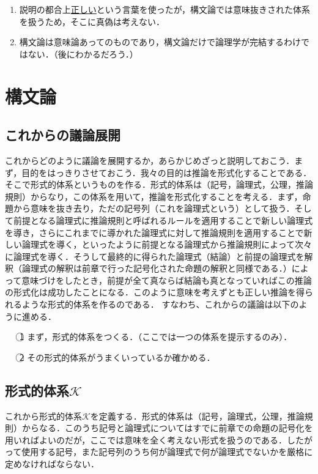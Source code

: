 \documentclass[10pt,b5paper,papersize,dvipdfmx]{jsbook}
\newcommand\maru[1]{\textcircled{\scriptsize{}#1}}
\newenvironment{TEIRI}[1]{
  \itemize
  \item [\headfont #1]
}{\enditemize}
\begin{document}
\begin{TEIRI}{※注意}
  \begin{enumerate}
    \item 説明の都合上\underline{正しい}という言葉を使ったが，構文論では意味抜きされた体系を扱うため，そこに真偽は考えない．
    \item 構文論は意味論あってのものであり，構文論だけで論理学が完結するわけではない．（後にわかるだろう．）
  \end{enumerate}
\end{TEIRI}

\section{構文論}
\subsection{これからの議論展開}
これからどのように議論を展開するか，あらかじめざっと説明しておこう．まず，目的をはっきりさせておこう．我々の目的は推論を形式化することである．そこで形式的体系というものを作る．形式的体系は（記号，論理式，公理，推論規則）からなり，この体系を用いて，推論を形式化することを考える．まず，命題から意味を抜き去り，ただの記号列（これを論理式という）として扱う．そして前提となる論理式に推論規則と呼ばれるルールを適用することで新しい論理式を導き，さらにこれまでに導かれた論理式に対して推論規則を適用することで新しい論理式を導く，といったように前提となる論理式から推論規則によって次々に論理式を導く．そうして最終的に得られた論理式（結論）と前提の論理式を解釈（論理式の解釈は前章で行った記号化された命題の解釈と同様である．）によって意味づけをしたとき，前提が全て真ならば結論も真となっていればこの推論の形式化は成功したことになる．このように意味を考えずとも正しい推論を得られるような形式的体系を作るのである．
すなわち、これからの議論は以下のように進める．
\begin{itemize}
  \item[\maru{1}]まず，形式的体系をつくる．（ここでは一つの体系を提示するのみ）．
  \item[\maru{2}]その形式的体系がうまくいっているか確かめる．
\end{itemize}

\subsection{形式的体系\texorpdfstring{$\mathcal K$}{K}} %
これから形式的体系$\mathcal K$を定義する．形式的体系は（記号，論理式，公理，推論規則）からなる．このうち記号と論理式についてはすでに前章での命題の記号化を用いればよいのだが，ここでは意味を全く考えない形式を扱うのである．したがって使用する記号，また記号列のうち何が論理式で何が論理式でないかを厳格に定めなければならない．
\end{document}
